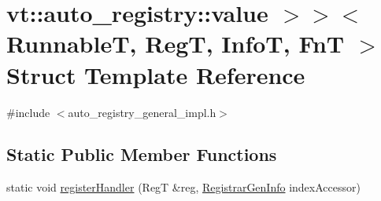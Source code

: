 \hypertarget{structvt_1_1auto__registry_1_1_registrar_helper_3_01_runnable_t_00_01_reg_t_00_01_info_t_00_01_f99b40767eb3aff35ccfdc592721ff945}{}\section{vt\+:\+:auto\+\_\+registry\+:\+:value $>$$>$$<$ RunnableT, RegT, InfoT, FnT $>$ Struct Template Reference}
\label{structvt_1_1auto__registry_1_1_registrar_helper_3_01_runnable_t_00_01_reg_t_00_01_info_t_00_01_f99b40767eb3aff35ccfdc592721ff945}


{\ttfamily \#include $<$auto\+\_\+registry\+\_\+general\+\_\+impl.\+h$>$}

\subsection*{Static Public Member Functions}
\begin{DoxyCompactItemize}
\item 
static void \hyperlink{structvt_1_1auto__registry_1_1_registrar_helper_3_01_runnable_t_00_01_reg_t_00_01_info_t_00_01_f99b40767eb3aff35ccfdc592721ff945_a42052bf466ae03218ee03de42dc0887e}{register\+Handler} (RegT \&reg, \hyperlink{structvt_1_1auto__registry_1_1_registrar_gen_info}{Registrar\+Gen\+Info} index\+Accessor)
\end{DoxyCompactItemize}



